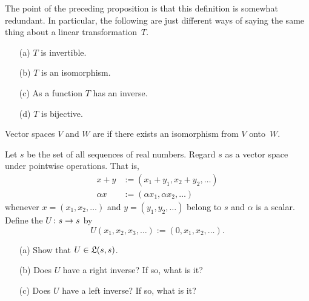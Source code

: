 The point of the preceding proposition is that this definition is somewhat redundant. In
particular, the following are just different ways of saying the same thing about a linear
transformation~$T$.
 \begin{enumerate}
  \item[(a)] $T$ is invertible.
  \item[(b)] $T$ is an isomorphism.
  \item[(c)] As a function $T$ has an inverse.
  \item[(d)] $T$ is bijective.
 \end{enumerate}

\begin{defn} Vector spaces $V$ and $W$ are
 if there exists an isomorphism from $V$ onto~$W$.
\end{defn}

\begin{prob} Let $s$ be the set of all sequences of real numbers. Regard $s$ as a vector space
under pointwise operations. That is,
 \begin{align*}
          x + y &:= (x_1 + y_1, x_2 + y_2, \dots)  \\
       \alpha x &:= (\alpha x_1, \alpha x_2, \dots)
 \end{align*}
whenever $x = (x_1, x_2,  \dots)$ and $y = (y_1, y_2, \dots)$ belong to $s$ and $\alpha$ is a
scalar.  Define the
 $U \colon  s \rightarrow s$ by  \[U(x_1,x_2,x_3,\dots) := (0,x_1,x_2,
\dots).\]
 \begin{enumerate}
  \item[(a)] Show that $U \in \mathfrak{L}(s,s)$.
  \item[(b)] Does $U$ have a right inverse?  If so, what is it?
  \item[(c)] Does $U$ have a left inverse?  If so, what is it?
 \end{enumerate}
\end{prob}


